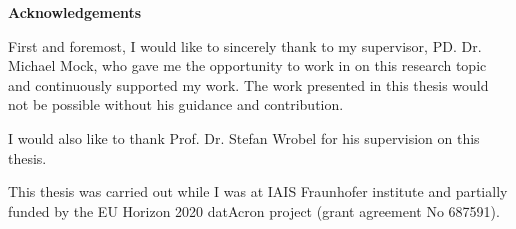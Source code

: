 

	\thispagestyle{empty}
{\noindent%
	\huge{\textbf{\textsf{Acknowledgements}}}
}
\vspace{2cm}
\begin{flushleft}
	\noindent%
	First and foremost, I would like to sincerely thank to my supervisor, PD. Dr. Michael Mock, who gave me the opportunity to work in on this research topic and continuously supported my work. The work presented in this thesis would not be possible without his guidance and contribution.
	
	 I would also like to thank Prof. Dr. Stefan Wrobel for his supervision on this thesis.  

This thesis was carried out while I was at IAIS Fraunhofer institute and  partially funded by the EU Horizon 2020 datAcron project (grant agreement No 687591).
	
	
\end{flushleft}
